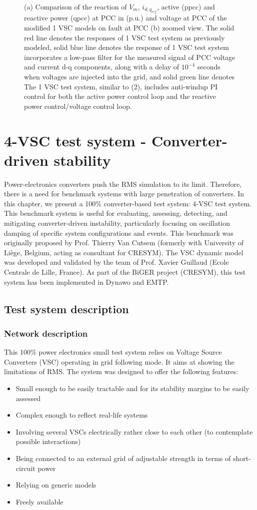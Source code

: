 \documentclass{report}
\begin{document}
\begin{figure}[htbp]
{  }
  \caption{(a) Comparison of the reaction of $V_m$, $i_{{d,q}_{ref}}$, active (ppcc) and reactive power (qpcc) at PCC in (p.u.) and voltage at PCC of the modified 1 VSC models on fault at PCC (b) zoomed view. The solid red line denotes the responses of 1 VSC test system as previously modeled, solid blue line denotes the response of 1 VSC test system incorporates a low-pass filter for the measured signal of PCC voltage and current d-q components, along with a delay of $10^{-4}$ seconds when voltages are injected into the grid, and solid green line denotes The 1 VSC test system, similar to (2), includes anti-windup PI control for both the active power control loop and the reactive power control/voltage control loop.}
\label{fig:1VSC_Comp}
\end{figure}

\chapter{4-VSC test system - Converter-driven stability}
Power-electronics converters push the RMS simulation to its limit. Therefore, there is a need for benchmark systems with large penetration of converters. In this chapter, we present a 100\% converter-based test system: 4-VSC test system. This benchmark system is useful for evaluating, assessing, detecting, and mitigating converter-driven instability, particularly focusing on oscillation damping of specific system configurations and events. This benchmark was originally proposed by Prof. Thierry Van Cutsem (formerly with University of Liège, Belgium, acting as consultant for CRESYM). The VSC dynamic model was developed and validated by the team of Prof. Xavier Guillaud (Ecole Centrale de Lille, France). As part of the BiGER project (CRESYM), this test system has been implemented in Dynawo and EMTP.

\section{Test system description}
\subsection{Network description}
This 100\% power electronics small test system relies on Voltage Source Converters (VSC) operating in grid following mode. It aims at showing the limitations of RMS. The system was designed to offer the following features:\begin{itemize}
    \item Small enough to be easily tractable and for its stability margins to be easily assessed
    \item Complex enough to reflect real-life systems
    \item Involving several VSCs electrically rather close to each other (to contemplate possible interactions)
    \item  Being connected to an external grid of adjustable strength in terms of short-circuit power
    \item  Relying on generic models
    \item  Freely available \cite{colib}
\end{itemize}
\end{document}
